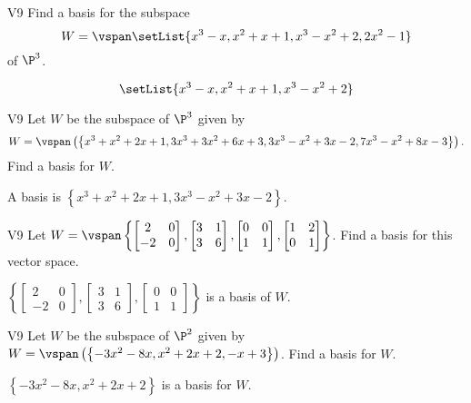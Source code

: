 \begin{problem}{V9}
Find a basis for the subspace 
\[W=\vspan\setList{ x^3-x, x^2+x+1, x^3-x^2+2, 2x^2-1 }\] of \(\P^3\).
\end{problem}
\begin{solution}
\[\setList{ x^3-x, x^2+x+1, x^3-x^2+2}\]
\end{solution}

\begin{problem}{V9}
Let \(W\) be the subspace of \(\P^3\) given by 
\[W = \vspan \left( \left\{ x^3+x^2+2x+1, 3x^3+3x^2+6x+3, 3x^3-x^2+3x-2, 7x^3-x^2+8x-3 \right\} \right).\]  
Find a basis for \(W\).
\end{problem}
\begin{solution}
A basis is
\( \left\{ x^3+x^2+2x+1, 3x^3-x^2+3x-2 \right\} \).
\end{solution}

\begin{problem}{V9}
Let \(
  W=\vspan\left\{
    \begin{bmatrix} 2 & 0 \\ -2 & 0 \end{bmatrix},
    \begin{bmatrix} 3 & 1 \\ 3 & 6 \end{bmatrix},
    \begin{bmatrix} 0 & 0 \\ 1 & 1 \end{bmatrix},
    \begin{bmatrix} 1 & 2 \\ 0 & 1 \end{bmatrix}
  \right\}
\). Find a basis for this vector space.
\end{problem}
\begin{solution}
\(\left\{
  \begin{bmatrix} 2 & 0 \\ -2 & 0 \end{bmatrix},
  \begin{bmatrix} 3 & 1 \\ 3 & 6 \end{bmatrix},
  \begin{bmatrix} 0 & 0 \\ 1 & 1 \end{bmatrix}
\right\}\) is a basis of \(W\).
\end{solution}

\begin{problem}{V9}
Let \(W\) be the subspace of \(\P^2\) given by \(W = \vspan \left( \left\{  -3x^2-8x, x^2+2x+2, -x+3\right\} \right)\).   Find a basis for \(W\).
\end{problem}
\begin{solution}
\(\left\{ -3x^2-8x, x^2+2x+2\right\} \) is a basis for \(W\).
\end{solution}
